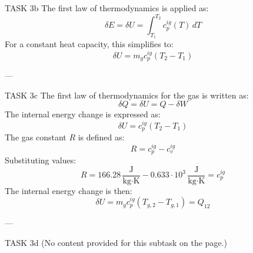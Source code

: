 TASK 3b  
The first law of thermodynamics is applied as:  
\[
\delta E = \delta U = \int_{T_1}^{T_2} c_p^{ig}(T) \, dT
\]  
For a constant heat capacity, this simplifies to:  
\[
\delta U = m_g c_p^{ig} (T_2 - T_1)
\]  

---

TASK 3c  
The first law of thermodynamics for the gas is written as:  
\[
\delta Q = \delta U = Q - \delta W
\]  
The internal energy change is expressed as:  
\[
\delta U = c_p^{ig} (T_2 - T_1)
\]  
The gas constant \( R \) is defined as:  
\[
R = c_p^{ig} - c_v^{ig}
\]  
Substituting values:  
\[
R = 166.28 \, \frac{\text{J}}{\text{kg·K}} - 0.633 \cdot 10^3 \, \frac{\text{J}}{\text{kg·K}} = c_p^{ig}
\]  
The internal energy change is then:  
\[
\delta U = m_g c_p^{ig} (T_{g,2} - T_{g,1}) = Q_{12}
\]  

---

TASK 3d  
(No content provided for this subtask on the page.)